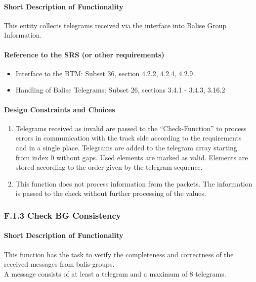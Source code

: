 \documentclass{template/openetcs_report}
\begin{document}
\paragraph{Short Description of Functionality}
This entity collects telegrams received via the interface into Balise Group Information.
	
\paragraph{Reference to the SRS (or other requirements)}
\begin{itemize}
\item Interface to the BTM: Subset 36, section  4.2.2, 4.2.4, 4.2.9\\
\item Handling of Balise Telegrams: Subset 26, sections 3.4.1 - 3.4.3, 3.16.2 \\
\end{itemize}

\paragraph{Design Constraints and Choices}
\begin{enumerate}
\item Telegrams received as invalid are passed to the ``Check-Function'' to process errors in communication with the track side according to the requirements and in a single place.
Telegrams are added to the telegram array starting from index 0 without gaps. Used elements are marked as valid. Elements are stored according to the order given by the telegram sequence.
\item This function does not process information from the packets. The information is passed to the check without further processing of the values. 
\end{enumerate}

\subsubsection{F.1.3 Check BG Consistency}

\paragraph{Short Description of Functionality}
This function has the task  to verify the completeness and correctness of the received messages from balis-groups.\\
A message consists of at least a telegram and a maximum of 8 telegrams.\\
\end{document}
